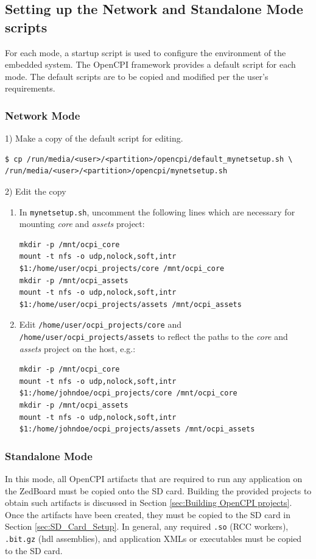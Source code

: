 \begin{flushleft}

\subsection{Setting up the Network and Standalone Mode scripts}

For each mode, a startup script is used to configure the environment of the embedded system. The OpenCPI framework provides a default script for each mode. The default scripts are to be copied and modified per the user's requirements.\par\medskip

\subsubsection{Network Mode}
1) Make a copy of the default script for editing.
\begin{verbatim}
$ cp /run/media/<user>/<partition>/opencpi/default_mynetsetup.sh \
/run/media/<user>/<partition>/opencpi/mynetsetup.sh
\end{verbatim}\medskip

2) Edit the copy
\begin{enumerate}
\item In \texttt{mynetsetup.sh}, uncomment the following lines which are necessary for mounting \textit{core} and \textit{assets} project:

\begin{verbatim}
mkdir -p /mnt/ocpi_core
mount -t nfs -o udp,nolock,soft,intr $1:/home/user/ocpi_projects/core /mnt/ocpi_core
mkdir -p /mnt/ocpi_assets
mount -t nfs -o udp,nolock,soft,intr $1:/home/user/ocpi_projects/assets /mnt/ocpi_assets
\end{verbatim}
 \item Edit \texttt{/home/user/ocpi\_projects/core} and \texttt{/home/user/ocpi\_projects/assets} to reflect the paths to the \textit{core} and \textit{assets} project on the host, e.g.:
\begin{verbatim}
mkdir -p /mnt/ocpi_core
mount -t nfs -o udp,nolock,soft,intr $1:/home/johndoe/ocpi_projects/core /mnt/ocpi_core
mkdir -p /mnt/ocpi_assets
mount -t nfs -o udp,nolock,soft,intr $1:/home/johndoe/ocpi_projects/assets /mnt/ocpi_assets
\end{verbatim}
\end{enumerate}

\subsubsection{Standalone Mode}
In this mode, all OpenCPI artifacts that are required to run any application on the ZedBoard must be copied onto the SD card.  Building the provided projects to obtain such artifacts is discussed in Section \ref{sec:Building OpenCPI projects}. Once the artifacts have been created, they must be copied to the SD card in Section \ref{sec:SD_Card_Setup}. In general, any required \texttt{.so} (RCC workers), \texttt{.bit.gz} (hdl assemblies), and application XMLs or executables must be copied to the SD card.\medskip


\end{flushleft}
